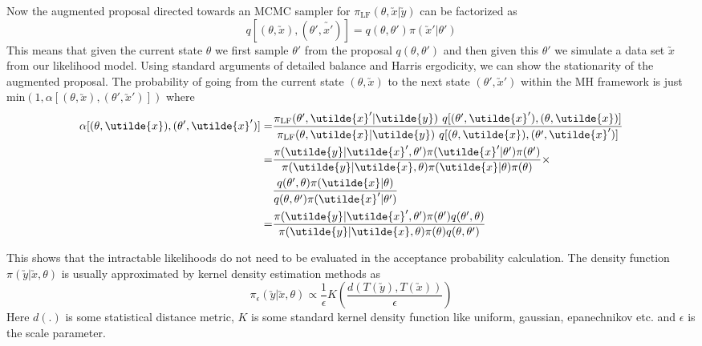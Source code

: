 \begin{multicols}{2}
Now the augmented proposal directed towards an MCMC sampler for $\pi_{\text{LF}}(\theta,\utilde{x}|\utilde{y})$ can be factorized as 
\begin{equation}
q[(\theta,\utilde{x}),(\theta',\utilde{x'})]=q(\theta,\theta')\pi(\utilde{x}'|\theta')
\end{equation}
This means that given the current state $\theta$ we first sample $\theta'$ from the proposal $q(\theta,\theta')$ and then given this $\theta'$ we simulate a data set $\utilde{x}$ from our likelihood model. Using standard arguments of detailed balance and Harris ergodicity, we can show the stationarity of the augmented proposal. The probability of going from the current state $(\theta,\utilde{x})$ to the next state $(\theta',\utilde{x}')$ within the MH framework is just $\text{min}(1,\alpha[(\theta,\utilde{x}),(\theta',\utilde{x}')])$ where
\begin{align*}
\alpha[(\theta,\utilde{x}),(\theta',\utilde{x}')]=&\dfrac{\pi_{\text{LF}}(\theta',\utilde{x}'|\utilde{y})\hspace{0.05in}q[(\theta',\utilde{x}'),(\theta,\utilde{x})]}{\pi_{\text{LF}}(\theta,\utilde{x}|\utilde{y})\hspace{0.05in}q[(\theta,\utilde{x}),(\theta',\utilde{x}')]}\\
=&\dfrac{\pi(\utilde{y}|\utilde{x}',\theta')\pi(\utilde{x}'|\theta')\pi(\theta')}{\pi(\utilde{y}|\utilde{x},\theta)\pi(\utilde{x}|\theta)\pi(\theta)}\times\\
&\dfrac{q(\theta',\theta)\pi(\utilde{x}|\theta)}{q(\theta,\theta')\pi(\utilde{x}'|\theta')}\\=&\dfrac{\pi(\utilde{y}|\utilde{x}',\theta')\pi(\theta')q(\theta',\theta)}{\pi(\utilde{y}|\utilde{x},\theta)\pi(\theta)q(\theta,\theta')}
\end{align*}

This shows that the intractable likelihoods do not need to be evaluated in the acceptance probability calculation. The density function $\pi(\utilde{y}|\utilde{x},\theta)$ is usually approximated by kernel density estimation methods as 
\begin{equation}
\pi_{\epsilon}(\utilde{y}|\utilde{x},\theta) \varpropto \dfrac{1}{\epsilon}K\left(\dfrac{d(T(\utilde{y}),T(\utilde{x}))}{\epsilon}\right)
\end{equation}
Here $d(.)$ is some statistical distance metric, $K$ is some standard kernel density function like uniform, gaussian, epanechnikov etc. and $\epsilon$ is the scale parameter. 


\end{multicols}

